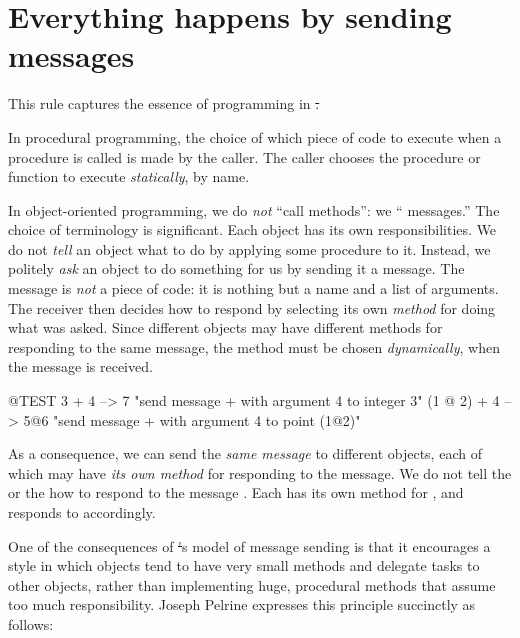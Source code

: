 \documentclass[a4paper,10pt,twoside]{book}
\begin{document}
\section{Everything happens by sending messages}


This rule captures the essence of programming in \st.

In procedural programming, the choice of which piece of code to execute when a procedure is called is made by the caller.
The caller chooses the procedure or function to execute \emph{statically}, by name.

In object-oriented programming, we do \emph{not} ``call methods'': we `` messages.''
The choice of terminology is significant.
Each object has its own responsibilities.
We do not \emph{tell} an object what to do by applying some procedure to it.
Instead, we politely \emph{ask} an object to do something for us by sending it a message.
The message is \emph{not} a piece of code: it is nothing but a name and a list of arguments.
The receiver then decides how to respond by selecting its own \emph{method} for doing what was asked.
Since different objects may have different methods for responding to the same message, the method must be chosen \emph{dynamically}, when the message is received.
\begin{code}{@TEST}
3 + 4         --> 7          "send message + with argument 4 to integer  3"
(1 @ 2) + 4 --> 5@6    "send message + with argument 4 to point (1@2)"
\end{code}
\noindent
As a consequence, we can send the \emph{same message} to different objects, each of which may have \emph{its own method} for responding to the message.
We do not tell the   or the   how to respond to the message .
Each has its own method for \ct{+}, and responds to  accordingly.

One of the consequences of \st's model of message sending is that it encourages a style in which objects tend to have very small methods and delegate tasks to other objects, rather than implementing huge, procedural methods that assume too much responsibility.
Joseph Pelrine expresses this principle succinctly as follows:
\end{document}
